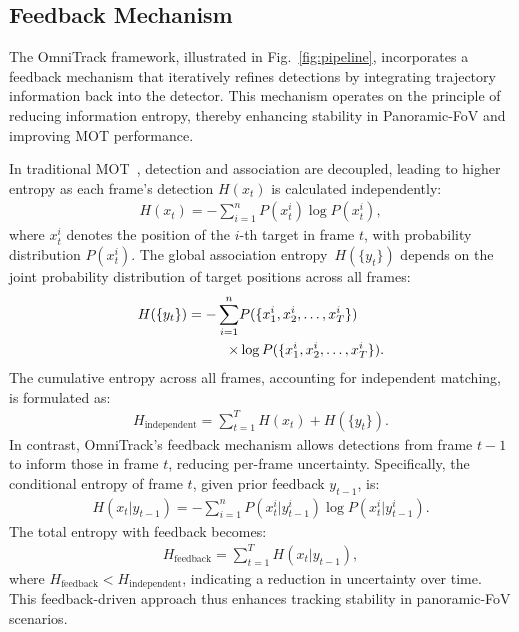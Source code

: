 %
\subsection{Feedback Mechanism}
\label{subsec:Framework}
%

The OmniTrack framework, illustrated in Fig.~\ref{fig:pipeline}, incorporates a feedback mechanism that iteratively refines detections by integrating trajectory information back into the detector. This mechanism operates on the principle of reducing information entropy, thereby enhancing stability in Panoramic-FoV and improving MOT performance.

%

In traditional MOT~\cite{zhang2022bytetrack,cao2023observation,du2023strongsort,aharon2022bot}, detection and association are decoupled, leading to higher entropy as each frame’s detection \( H(x_t) \) is calculated independently:
\begin{align}
H(x_t) = -\sum_{i=1}^{n} P(x_t^i) \log P(x_t^i),
\end{align}
where \( x_t^i \) denotes the position of the \( i \)-th target in frame \( t \), with probability distribution \( P(x_t^i) \). The global association entropy~\(H(\{y_t\}) \) depends on the joint probability distribution of target positions across all frames:
\begin{align}
H(\{y_t\}) = -\sum_{i=1}^{n} &P(\{x_1^i, x_2^i, \dots, x_T^i\}) \notag  \\ \times  & \log P(\{x_1^i, x_2^i, \dots, x_T^i\}). 
\label{eq:2}
\end{align} 
The cumulative entropy across all frames, accounting for independent matching, is formulated as:
\begin{align}
H_{\text{independent}} = \sum_{t=1}^{T} H(x_t) + H(\{y_t\}).
\end{align}
%
In contrast, OmniTrack’s feedback mechanism allows detections from frame \( t{-}1 \) to inform those in frame \( t \), reducing per-frame uncertainty. Specifically, the conditional entropy of frame \( t \), given prior feedback \( y_{t-1} \), is:
\begin{align}
H(x_t | y_{t-1}) = -\sum_{i=1}^{n} P(x_t^i | y_{t-1}^i) \log P(x_t^i | y_{t-1}^i).
\end{align}
The total entropy with feedback becomes:
\begin{align}
H_{\text{feedback}} = \sum_{t=1}^{T} H(x_t | y_{t-1}),
\end{align}
where \( H_{\text{feedback}} {<} H_{\text{independent}} \), indicating a reduction in uncertainty over time. This feedback-driven approach thus enhances tracking stability in panoramic-FoV scenarios. 

